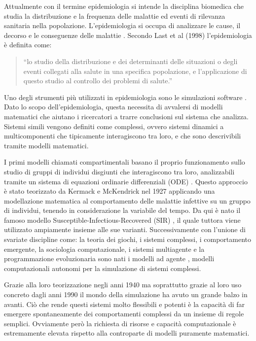Attualmente con il termine epidemiologia si intende la 
disciplina biomedica che studia la distribuzione e la 
frequenza delle malattie ed eventi di rilevanza sanitaria 
nella popolazione. L’epidemiologia si occupa di analizzare 
le cause, il decorso e le conseguenze delle malattie \cite{wiki:Epidemiologia}. 
Secondo Last et al (1998) l’epidemiologia è definita come: 

\begin{quotation}
    “lo studio della distribuzione e dei determinanti 
    delle situazioni o degli eventi collegati alla salute 
    in una specifica popolazione, e l'applicazione di 
    questo studio al controllo dei problemi di salute.”
\end{quotation}

Uno degli strumenti più utilizzati in epidemiologia sono le 
simulazioni software \cite{wiki:Simulation_software}. 
Dato lo scopo dell’epidemiologia, questa necessita di 
avvalersi di modelli matematici \cite{doi:10.4161/viru.24041} 
che aiutano i ricercatori a trarre conclusioni sul sistema 
che analizza. Sistemi simili vengono definiti come complessi,
\cite{Galea2009-lj} \cite{Ladyman2013} ovvero sistemi 
dinamici a multicomponenti che tipicamente interagiscono 
tra loro, e che sono descrivibili tramite modelli matematici. 

I primi modelli chiamati compartimentali \cite{Bjornstad2020} 
basano il proprio funzionamento sullo studio di gruppi di 
individui disgiunti che interagiscono tra loro, 
analizzabili tramite un sistema di equazioni ordinarie 
differenziali (ODE) \cite{Brauer2008}. 
Questo approccio è stato teorizzato da Kermack e McKendrick 
nel 1927 applicando una modellazione matematica al comportamento 
delle malattie infettive su un gruppo di individui, tenendo in 
considerazione la variabile del tempo. Da qui è nato il famoso modello 
Susceptible-Infectious-Recovered (SIR) \cite{wiki:Compartmental_models_in_epidemiology}, 
il quale tuttora viene utilizzato ampiamente insieme alle sue varianti. 
Successivamente con l’unione di svariate discipline come: 
la teoria dei giochi, i sistemi complessi, i comportamento emergente, 
la sociologia computazionale, i sistemi multiagente e 
la programmazione evoluzionaria sono nati i modelli ad agente 
\cite{7822080} \cite{Bissett2021}, modelli computazionali 
autonomi per la simulazione di sistemi complessi. 

Grazie alla loro teorizzazione negli anni 1940 ma soprattutto 
grazie al loro uso concreto dagli anni 1990 il mondo della 
simulazione ha avuto un grande balzo in avanti. 
Ciò che rende questi sistemi molto flessibili e potenti è la 
capacità di far emergere spontaneamente dei comportamenti 
complessi da un insieme di regole semplici. 
Ovviamente però la richiesta di risorse e capacità 
computazionale è estremamente elevata rispetto alla 
controparte di modelli puramente matematici. 

